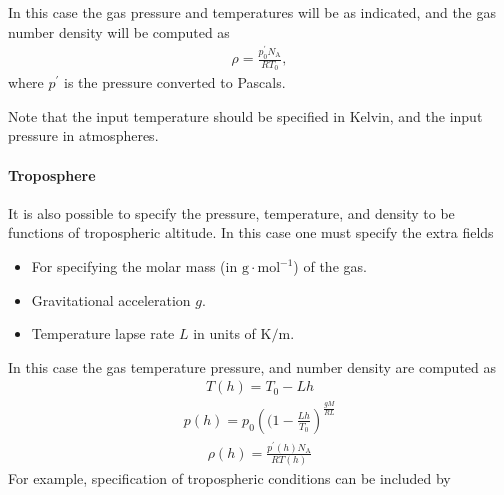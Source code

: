\documentclass[letterpaper,10pt,english]{sphinxmanual}
\begin{document}
In this case the gas pressure and temperatures will be as indicated, and the gas number density will be computed as
\begin{equation*}
\begin{split}\rho = \frac{p_0^\prime N_{\textrm{A}}}{RT_0},\end{split}
\end{equation*}
where \(p^\prime\) is the pressure converted to Pascals.

Note that the input temperature should be specified in Kelvin, and the input pressure in atmospheres.


\paragraph{Troposphere}
\label{\detokenize{Applications/CdrPlasmaModel:troposphere}}
It is also possible to specify the pressure, temperature, and density to be functions of tropospheric altitude.
In this case one must specify the extra fields
\begin{itemize}
\item {} 
 For specifying the molar mass (in \(\textrm{g}\cdot\textrm{mol}^{-1}\)) of the gas.

\item {} 
 Gravitational acceleration \(g\).

\item {} 
 Temperature lapse rate \(L\) in units of \(\textrm{K}/\textrm{m}\).

\end{itemize}

In this case the gas temperature pressure, and number density are computed as
\begin{equation*}
\begin{split}T(h) = T_0 - Lh\end{split}
\end{equation*}\begin{equation*}
\begin{split}p(h) = p_0\left((1 - \frac{Lh}{T_0}\right)^{\frac{g M}{RL}}\end{split}
\end{equation*}\begin{equation*}
\begin{split}\rho(h) = \frac{p^\prime(h) N_{\textrm{A}}}{RT(h)}\end{split}
\end{equation*}
For example, specification of tropospheric conditions can be included by
\end{document}
